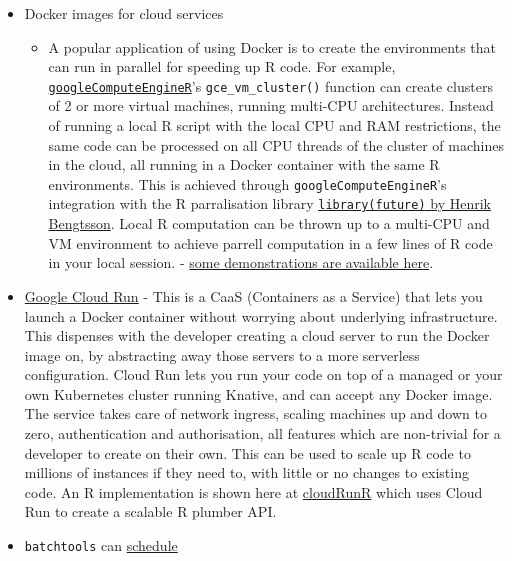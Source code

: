 \begin{itemize}
\tightlist
\item
  Docker images for cloud services

  \begin{itemize}
  \tightlist
  \item
    A popular application of using Docker is to create the environments
    that can run in parallel for speeding up R code. For example,
    \href{https://CRAN.R-project.org/package=googleComputeEngineR}{\texttt{googleComputeEngineR}}'s
    \texttt{gce\_vm\_cluster()} function can create clusters of 2 or
    more virtual machines, running multi-CPU architectures. Instead of
    running a local R script with the local CPU and RAM restrictions,
    the same code can be processed on all CPU threads of the cluster of
    machines in the cloud, all running in a Docker container with the
    same R environments. This is achieved through
    \texttt{googleComputeEngineR}'s integration with the R parralisation
    library
    \href{https://CRAN.R-project.org/package=future}{\texttt{library(future)}
    by Henrik Bengtsson}. Local R computation can be thrown up to a
    multi-CPU and VM environment to achieve parrell computation in a few
    lines of R code in your local session. -
    \href{https://cloudyr.github.io/googleComputeEngineR/articles/massive-parallel.html}{some
    demonstrations are available here}.
  \end{itemize}
\item
  \href{https://cloud.run}{Google Cloud Run} - This is a CaaS
  (Containers as a Service) that lets you launch a Docker container
  without worrying about underlying infrastructure. This dispenses with
  the developer creating a cloud server to run the Docker image on, by
  abstracting away those servers to a more serverless configuration.
  Cloud Run lets you run your code on top of a managed or your own
  Kubernetes cluster running Knative, and can accept any Docker image.
  The service takes care of network ingress, scaling machines up and
  down to zero, authentication and authorisation, all features which are
  non-trivial for a developer to create on their own. This can be used
  to scale up R code to millions of instances if they need to, with
  little or no changes to existing code. An R implementation is shown
  here at
  \href{https://github.com/MarkEdmondson1234/cloudRunR}{cloudRunR} which
  uses Cloud Run to create a scalable R plumber API.
\item
  \texttt{batchtools} \citep{Lang2017batchtools} can
  \href{https://mllg.github.io/batchtools/reference/makeClusterFunctionsDocker.html}{schedule
}
\end{itemize}
